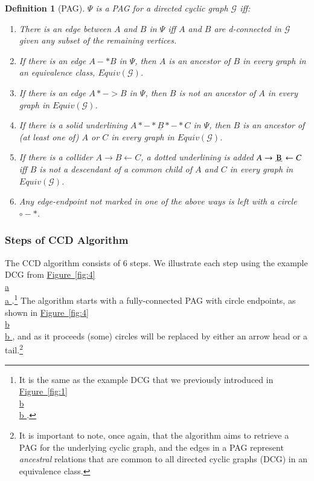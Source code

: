 \documentclass[11pt]{article}
\newcommand{\udensdot}[1]{%
    \tikz[baseline=(todotted.base)]{
        \node[inner sep=1pt,outer sep=0pt] (todotted) {#1};
        \draw[densely dotted, thick] (todotted.south west) -- (todotted.south east);
    }%
}%
\newcommand*{\figref}[2][]{%
  \hyperref[{fig:#2}]{%
    Figure~\ref*{fig:#2}%
    \ifx\\#1\\%
    \else
      #1%
    \fi
  }%
}
\newtheorem{definition}{Definition}
\begin{document}
\begin{definition} [PAG] \label{def: def2}
\textup{$\Psi$ is a PAG for a directed cyclic graph $\mathcal{G}$ iff:}
\begin{enumerate}[nolistsep]
    \item \textup{There is an edge between $A$ and $B$ in $\Psi$ iff $A$ and $B$ are d-connected in $\mathcal{G}$ given any subset of the remaining vertices.}
    
    \item \textup{If there is an edge $A -* B$ in $\Psi$, then $A$ is an ancestor of $B$ in every graph in an equivalence class, $Equiv(\mathcal{G})$.}

    \item \textup{If there is an edge $A *-> B$ in $\Psi$, then $B$ is \textit{not} an ancestor of $A$ in every graph in $Equiv(\mathcal{G})$.}

    \item \textup{If there is a solid underlining $A *-*\underline{B}*-*C$ in $\Psi$, then $B$ is an ancestor of (at least one of) $A$ or $C$ in every graph in $Equiv(\mathcal{G})$.}

    \item \textup{If there is a collider $A \rightarrow B \leftarrow C$, a dotted underlining is added $A \rightarrow \udensdot{B} \leftarrow C$ iff $B$ is \textit{not} a descendant of a common child of $A$ and $C$ in every graph in $Equiv(\mathcal{G})$.}
    \item \textup{Any edge-endpoint not marked in one of the above ways is left with a circle $\circ-*$.}
    
\end{enumerate}
\end{definition}

\subsubsection{Steps of CCD Algorithm}
The CCD algorithm consists of 6 steps. We illustrate each step using the example DCG from \figref[a]{4}.\footnote{It is the same as the example DCG that we previously introduced in \figref[b]{1}.} The algorithm starts with a fully-connected PAG with circle endpoints, as shown in \figref[b]{4}, and as it proceeds (some) circles will be replaced by either an arrow head or a tail.\footnote{It is important to note, once again, that the algorithm aims to retrieve a PAG for the underlying cyclic graph, and the edges in a PAG represent \textit{ancestral} relations that are common to all directed cyclic graphs (DCG) in an equivalence class.}
\end{document}
